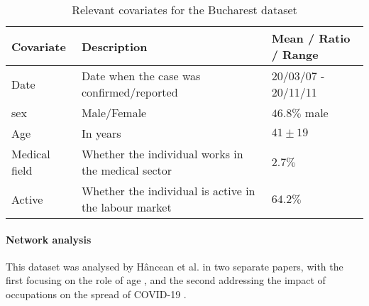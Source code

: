 \begin{table}
	\begin{mdframed}
		\begin{tabularx}{\linewidth}{XXX}
		\hline
		\textbf{Covariate} & \textbf{Description} & \textbf{Mean / Ratio / Range}\\
		\hline
		\hline
		Date & Date when the case was confirmed/reported & 20/03/07 - 20/11/11\\
		\hline
		sex & Male/Female & $46.8\%$ male\\
		\hline
		Age & In years & $41\pm19$ \\
		\hline
		Medical field & Whether the individual works in the medical sector & $2.7\%$ \\
		\hline
		Active & Whether the individual is active in the labour market & $64.2\%$ \\
		\hline
		\hline
	\end{tabularx}
	\caption{Relevant covariates for the Bucharest dataset}
	\label{tab:bucharest_covariates}
	\end{mdframed}
\end{table}

\paragraph{Network analysis} This dataset was analysed by H\^ancean et al. in two separate papers, with the first focusing on the role of age \cite{hancean2021role}, and the second addressing the impact of occupations on the spread of COVID-19 \cite{hancean2022occupations}.

\bigskip

